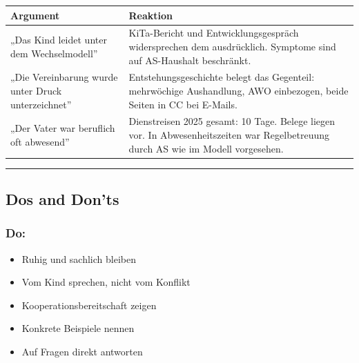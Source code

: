 \documentclass[
  11pt,
  a4paper,
]{article}
\newcounter{none}
\providecommand{\tightlist}{%
  \setlength{\itemsep}{0pt}\setlength{\parskip}{0pt}}
\begin{document}
{\def\LTcaptype{none} %
\begin{longtable}[]{@{}
  >{\raggedright\arraybackslash}p{}
  >{\raggedright\arraybackslash}p{}@{}}
\toprule\noalign{}
\begin{minipage}[b]{\linewidth}\raggedright
Argument
\end{minipage} & \begin{minipage}[b]{\linewidth}\raggedright
Reaktion
\end{minipage} \\
\midrule\noalign{}
\endhead
\bottomrule\noalign{}
\endlastfoot
„Das Kind leidet unter dem Wechselmodell'' & KiTa-Bericht und
Entwicklungsgespräch widersprechen dem ausdrücklich. Symptome sind auf
AS-Haushalt beschränkt. \\
„Die Vereinbarung wurde unter Druck unterzeichnet'' &
Entstehungsgeschichte belegt das Gegenteil: mehrwöchige Aushandlung, AWO
einbezogen, beide Seiten in CC bei E-Mails. \\
„Der Vater war beruflich oft abwesend'' & Dienstreisen 2025 gesamt: 10
Tage. Belege liegen vor. In Abwesenheitszeiten war Regelbetreuung durch
AS wie im Modell vorgesehen. \\
\end{longtable}
}

\begin{center}\rule{0.5\linewidth}{0.5pt}\end{center}

\subsection{Dos and Don'ts}\label{dos-and-donts}

\subsubsection{Do:}\label{do}

\begin{itemize}
\tightlist
\item
  Ruhig und sachlich bleiben
\item
  Vom Kind sprechen, nicht vom Konflikt
\item
  Kooperationsbereitschaft zeigen
\item
  Konkrete Beispiele nennen
\item
  Auf Fragen direkt antworten
\end{itemize}
\end{document}
